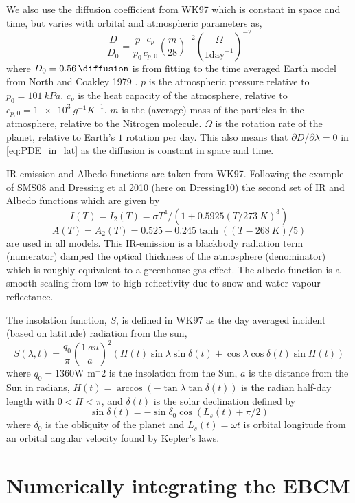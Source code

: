 \documentclass[12pt, onecolumn]{revtex4-2}    %
\begin{document}
We also use the diffusion coefficient from WK97 which is constant in space and time, but varies with orbital and atmospheric parameters as,
$$
    \frac{D}{D_0} = \frac{p}{p_0} \frac{c_p}{c_{p,0}} \left(\frac{m}{28}\right)^{-2} \left(\frac{\Omega}{1 \text{day}^{-1}}\right)^{-2}
$$
where $D_0 = \qty{0.56}{\diffusion}$ is from fitting to the time averaged Earth model from North and Coakley 1979 \cite{NC79}.
$p$ is the atmospheric pressure relative to $p_0 = \qty{101}{kPa}$.
$c_p$ is the heat capacity of the atmosphere, relative to $c_{p,0} = \qty{1e3}{g^{-1} K^{-1}}$.
$m$ is the (average) mass of the particles in the atmosphere, relative to the Nitrogen molecule.
$\Omega$ is the rotation rate of the planet, relative to Earth's $1$ rotation per day.
This also means that $\partial D / \partial \lambda = 0$ in \eqref{eq:PDE_in_lat} as the diffusion is constant in space and time.

IR-emission and Albedo functions are taken from WK97. Following the example of SMS08 and Dressing et al 2010 (here on Dressing10) \cite{Dressing10} the second set of IR and Albedo functions which are given by
$$
    I(T) = I_2(T) = \sigma T^4 / (1 + 0.5925 (T/\qty{273}{K}) ^ 3)
$$
$$
    A(T) = A_2(T) = 0.525 - 0.245 \tanh((T-\qty{268}{K}) / 5)
$$
are used in all models.
This IR-emission is a blackbody radiation term (numerator) damped the optical thickness of the atmosphere (denominator) which is roughly equivalent to a greenhouse gas effect.
The albedo function is a smooth scaling from low to high reflectivity due to snow and water-vapour reflectance.

The insolation function, $S$, is defined in WK97 as the day averaged incident (based on latitude) radiation from the sun,
$$
    S(\lambda, t) = \frac{q_0}{\pi} \left(\frac{\qty{1}{au}}{a}\right)^2 (H(t) \sin{\lambda} \sin{\delta(t)} + \cos{\lambda} \cos{\delta(t)} \sin{H(t)})
$$
where $q_0=1360 $W m$^-2$ is the insolation from the Sun,
$a$ is the distance from the Sun in radians,
$H(t) = \arccos(-\tan\lambda \tan \delta(t))$ is the radian half-day length with $0 < H < \pi$,
and $\delta(t)$ is the solar declination defined by
$$
    \sin\delta(t) = -\sin\delta_0 \cos(L_s(t) + \pi/2)
$$
where $\delta_0$ is the obliquity of the planet and $L_s(t) = \omega t$ is orbital longitude from an orbital angular velocity found by Kepler's laws.

\section{Numerically integrating the EBCM} \label{sec:solve_PDE}
\end{document}
